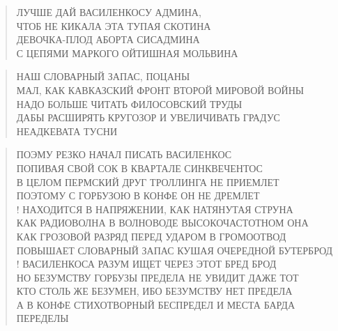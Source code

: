 \poemtitle{***}
\begin{verse}
ЛУЧШЕ ДАЙ ВАСИЛЕНКОСУ АДМИНА, \\
ЧТОБ НЕ КИКАЛА ЭТА ТУПАЯ СКОТИНА\\
ДЕВОЧКА-ПЛОД АБОРТА СИСАДМИНА\\
С ЦЕПЯМИ МАРКОГО ОЙТИШНАЯ МОЛЬВИНА
\end{verse}

\poemtitle{***}
\begin{verse}
НАШ СЛОВАРНЫЙ ЗАПАС, ПОЦАНЫ\\
МАЛ, КАК КАВКАЗСКИЙ ФРОНТ ВТОРОЙ МИРОВОЙ ВОЙНЫ\\
НАДО БОЛЬШЕ ЧИТАТЬ ФИЛОСОВСКИЙ ТРУДЫ\\
ДАБЫ РАСШИРЯТЬ КРУГОЗОР И УВЕЛИЧИВАТЬ ГРАДУС НЕАДКЕВАТА ТУСНИ
\end{verse}

\poemtitle{***}
\begin{verse}
ПОЭМУ РЕЗКО НАЧАЛ ПИСАТЬ ВАСИЛЕНКОС\\
ПОПИВАЯ СВОЙ СОК В КВАРТАЛЕ СИНКВЕЧЕНТОС\\
В ЦЕЛОМ ПЕРМСКИЙ ДРУГ ТРОЛЛИНГА НЕ ПРИЕМЛЕТ\\
ПОЭТОМУ С ГОРБУЗОЮ В КОНФЕ ОН НЕ ДРЕМЛЕТ\\!
НАХОДИТСЯ В НАПРЯЖЕНИИ, КАК НАТЯНУТАЯ СТРУНА\\
КАК РАДИОВОЛНА В ВОЛНОВОДЕ ВЫСОКОЧАСТОТНОМ ОНА\\
КАК ГРОЗОВОЙ РАЗРЯД ПЕРЕД УДАРОМ В ГРОМООТВОД\\
ПОВЫШАЕТ СЛОВАРНЫЙ ЗАПАС КУШАЯ ОЧЕРЕДНОЙ БУТЕРБРОД\\!
ВАСИЛЕНКОСА РАЗУМ ИЩЕТ ЧЕРЕЗ ЭТОТ БРЕД БРОД\\
НО БЕЗУМСТВУ ГОРБУЗЫ ПРЕДЕЛА НЕ УВИДИТ ДАЖЕ ТОТ\\
КТО СТОЛЬ ЖЕ БЕЗУМЕН, ИБО БЕЗУМСТВУ НЕТ ПРЕДЕЛА\\
А В КОНФЕ СТИХОТВОРНЫЙ БЕСПРЕДЕЛ И МЕСТА БАРДА ПЕРЕДЕЛЫ
\end{verse}


